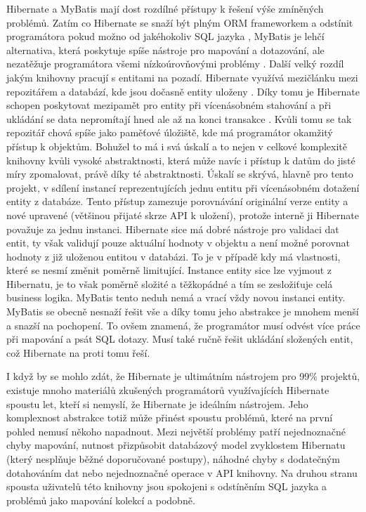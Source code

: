 		Hibernate a MyBatis mají dost rozdílné přístupy k řešení výše zmíněných problémů.
		Zatím co Hibernate se snaží být plným \ac{ORM} frameworkem a odstínit programátora pokud možno od jakéhokoliv
		\ac{SQL} jazyka \cite{hibernate_docs}, MyBatis je lehčí alternativa, která poskytuje spíše nástroje pro mapování a dotazování, ale
		nezatěžuje programátora všemi nízkoúrovňovými problémy \cite{mybatis_getting_started}.
		Další velký rozdíl jakým knihovny pracují s entitami na pozadí.
		Hibernate využívá mezičlánku mezi repozitářem a databází, kde jsou dočasně entity uloženy \cite{hibernate_docs}.
		Díky tomu je Hibernate schopen poskytovat mezipamět pro entity při vícenásobném stahování a při ukládání
		se data nepromítají hned ale až na konci transakce \cite{hibernate_docs}.
		Kvůli tomu se tak repozitář chová spíše jako paměťové úložiště, kde má programátor okamžitý přístup k objektům.
		Bohužel to má i svá úskalí a to nejen v celkové komplexitě knihovny kvůli vysoké abstraktnosti, která může navíc
		i přístup k datům do jisté míry zpomalovat, právě díky té abstraktnosti.
		Úskalí se skrývá, hlavně pro tento projekt, v sdílení instancí reprezentujících jednu entitu při vícenásobném
		dotažení entity z databáze.
		Tento přístup zamezuje porovnávání originální verze entity a nové upravené (většinou přijaté skrze \ac{API} k
		uložení), protože interně ji Hibernate považuje za jednu instanci.
		Hibernate sice má dobré nástroje pro validaci dat entit, ty však validují pouze aktuální hodnoty v objektu a
		není možné porovnat hodnoty z již uloženou entitou v databázi.
		To je v případě kdy má vlastnosti, které se nesmí změnit poměrně limitující.
		Instance entity sice lze vyjmout z Hibernatu, je to však poměrně složité a těžkopádné a tím se zesložiťuje
		celá business logika.
		MyBatis tento neduh nemá a vrací vždy novou instanci entity.
		MyBatis se obecně nesnaží řešit vše a díky tomu jeho abstrakce je mnohem menší a snazší na pochopení.
		To ovšem znamená, že programátor musí odvést více práce při mapování a psát \ac{SQL} dotazy.
		Musí také ručně řešit ukládání složených entit, což Hibernate na proti tomu řeší.

		I když by se mohlo zdát, že Hibernate je ultimátním nástrojem pro 99\% projektů, existuje mnoho materiálů
		zkušených programátorů využívajících Hibernate spoustu let, kteří si nemyslí, že Hibernate je ideálním nástrojem.
		Jeho komplexnost abstrakce totiž může přinést spoustu problémů, které na první pohled nemusí někoho napadnout.
		Mezi největší problémy patří nejednoznačné chyby mapování, nutnost přizpůsobit databázový model zvyklostem Hibernatu
		(který nesplňuje běžné doporučované postupy), náhodné chyby s dodatečným dotahováním dat nebo nejednoznačné operace
		v \ac{API} knihovny.
		Na druhou stranu spousta uživatelů této knihovny jsou spokojeni s odstíněním \ac{SQL} jazyka a problémů jako
		mapování kolekcí a podobně. \cite{bad_hibernate}

